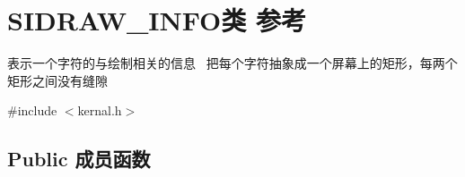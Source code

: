 \hypertarget{class_s_i_d_r_a_w___i_n_f_o}{}\section{S\+I\+D\+R\+A\+W\+\_\+\+I\+N\+F\+O类 参考}
\label{class_s_i_d_r_a_w___i_n_f_o}


表示一个字符的与绘制相关的信息~\newline
把每个字符抽象成一个屏幕上的矩形，每两个矩形之间没有缝隙  




{\ttfamily \#include $<$kernal.\+h$>$}

\subsection*{Public 成员函数}

